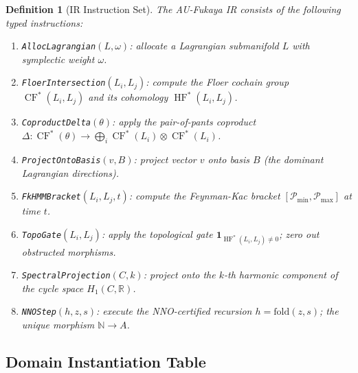 \documentclass[11pt]{amsart}
\newtheorem{definition}[theorem]{Definition}
\DeclareMathOperator{\HF}{HF}
\DeclareMathOperator{\CF}{CF}
\begin{document}
\begin{definition}[IR Instruction Set]
The AU-Fukaya IR consists of the following typed instructions:
\begin{enumerate}
\item \texttt{AllocLagrangian}$(L, \omega)$: allocate a Lagrangian
  submanifold $L$ with symplectic weight $\omega$.
\item \texttt{FloerIntersection}$(L_i, L_j)$: compute the Floer
  cochain group $\CF^*(L_i, L_j)$ and its cohomology $\HF^*(L_i, L_j)$.
\item \texttt{CoproductDelta}$(\theta)$: apply the pair-of-pants
  coproduct $\Delta: \CF^*(\theta) \to \bigoplus_i \CF^*(L_i) \otimes \CF^*(L_i)$.
\item \texttt{ProjectOntoBasis}$(v, B)$: project vector $v$ onto
  basis $B$ (the dominant Lagrangian directions).
\item \texttt{FkHMMBracket}$(L_i, L_j, t)$: compute the Feynman-Kac
  bracket $[\mathcal{P}_{\min}, \mathcal{P}_{\max}]$ at time $t$.
\item \texttt{TopoGate}$(L_i, L_j)$: apply the topological gate
  $\mathbf{1}_{\HF^*(L_i,L_j) \neq 0}$; zero out obstructed morphisms.
\item \texttt{SpectralProjection}$(C, k)$: project onto the
  $k$-th harmonic component of the cycle space $H_1(C, \mathbb{R})$.
\item \texttt{NNOStep}$(h, z, s)$: execute the NNO-certified
  recursion $h = \mathrm{fold}(z, s)$; the unique morphism $\mathbb{N} \to A$.
\end{enumerate}
\end{definition}

\subsection{Domain Instantiation Table}
\end{document}

